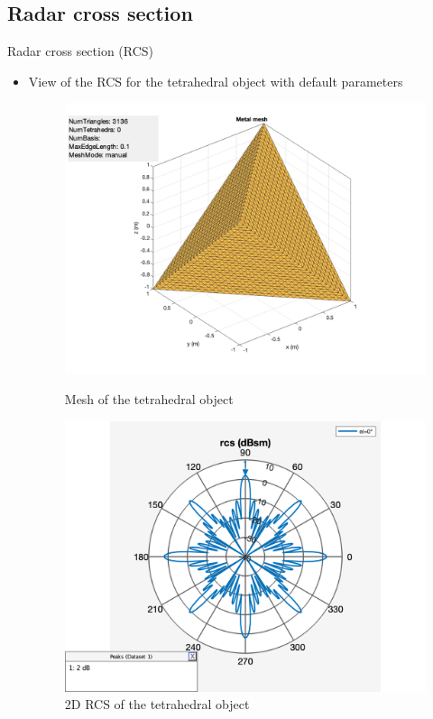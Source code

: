\documentclass{beamer}
\newcounter{section}
\begin{document}
\subsection{Radar cross section}
\setcounter{section}{3}
\setcounter{figure}{0}
\begin{frame}[t]{Radar cross section (RCS)}
	\begin{itemize}
	    \item View of the RCS for the tetrahedral object with default parameters
        \vspace{0.5\baselineskip}
            \begin{figure}
                \centering
                \begin{minipage}{0.47\textwidth}
                    \centering
                    \includegraphics[height=0.7\textwidth]{figures/mesh_tetrahedral.png}
                    \caption{Mesh of the tetrahedral object}
                \end{minipage}
                \begin{minipage}{0.47\textwidth}
                    \centering
                    \includegraphics[height=0.7\textwidth]{figures/rcs_tetrahedral.png}
                    \caption{2D RCS of the tetrahedral object}
                \end{minipage}
            \end{figure}
	\end{itemize}
\end{frame}
\end{document}
